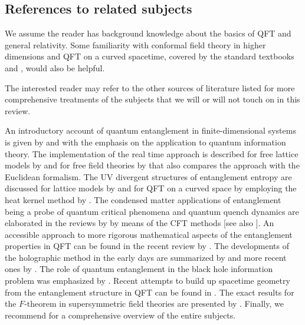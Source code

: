 \subsection{References to related subjects}
We assume the reader has background knowledge about the basics of QFT and general relativity.
Some familiarity with conformal field theory in higher dimensions and QFT on a curved spacetime, covered by the standard textbooks \cite{DiFrancesco:1997nk} and \cite{Birrell:1982ix}, would also be helpful.

The interested reader may refer to the other sources of literature listed for more comprehensive treatments of the subjects that we will or will not touch on in this review.

An introductory account of quantum entanglement in finite-dimensional systems is given by \textcite{nielsen2010quantum} and \textcite{Preskill:1997tq} with the emphasis on the application to quantum information theory.
The implementation of the real time approach is described for free lattice models by \textcite{peschel2009reduced} and for free field theories by \textcite{Casini:2009sr} that also  compares the approach with the Euclidean formalism.
The UV divergent structures of entanglement entropy are discussed for lattice models by \textcite{eisert2010colloquium} and for QFT on a curved space by employing the heat kernel method by \textcite{Solodukhin:2011gn}.
The condensed matter applications of entanglement being a probe of quantum critical phenomena and quantum quench dynamics are elaborated in the reviews by \textcite{Calabrese:2009qy,Calabrese:2016xau} by means of the CFT methods [see also \textcite{Laflorencie:2015eck}].
An accessible approach to more rigorous mathematical aspects of the entanglement properties in QFT can be found in the recent review by \textcite{Witten:2018zxz}.
The developments of the holographic method in the early days are summarized by \textcite{Nishioka:2009un} and more recent ones by \textcite{Takayanagi:2012kg}.
The role of quantum entanglement in the black hole information problem was emphasized by \textcite{Harlow:2014yka}.
Recent attempts to build up spacetime geometry from the entanglement structure in QFT can be found in \textcite{VanRaamsdonk:2016exw}.
The exact results for the $F$-theorem in supersymmetric field theories are presented by \textcite{Pufu:2016zxm}.
Finally, we recommend \textcite{Rangamani:2016dms} for a comprehensive overview of the entire subjects.


\endinput